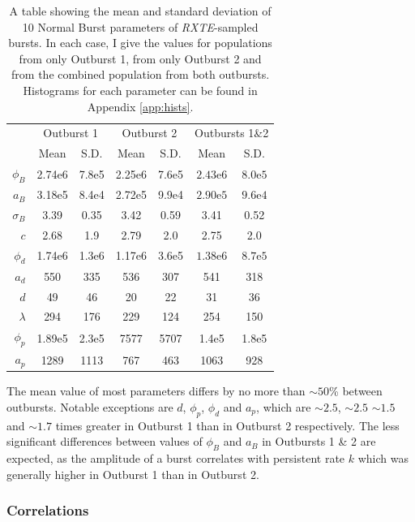 \begin{table}
\centering
\begin{tabular}{r c c c c c c}
\hline
\hline
 & \multicolumn{2}{c}{\scriptsize Outburst 1} & \multicolumn{2}{c}{\scriptsize Outburst 2} & \multicolumn{2}{c}{\scriptsize Outbursts 1\&2}  \\
 &Mean&S.D.&Mean&S.D.&Mean&S.D.\\
\hline
$\phi_B$&2.74e6&7.8e5&2.25e6&7.6e5&$2.43\mathrm{e}6$&$8.0\mathrm{e}5$\\
$a_B$&3.18e5&8.4e4&2.72e5&9.9e4&$2.90\mathrm{e}5$&$9.6\mathrm{e}4$\\
$\sigma_B$&3.39&0.35&3.42&0.59&3.41&0.52\\
$c$&2.68&1.9&2.79&2.0&2.75&2.0\\
$\phi_d$&1.74e6&1.3e6&1.17e6&3.6e5&$1.38\mathrm{e}6$&$8.7\mathrm{e}5$\\
$a_d$&550&335&536&307&541&318\\
$d$&49&46&20&22&31&36\\
$\lambda$&294&176&229&124&254&150\\
$\phi_p$&1.89e5&2.3e5&7577&5707&1.4e5&1.8e5\\
$a_p$&1289&1113&767&463&1063&928\\
\hline
\hline
\end{tabular}
\caption[A table showing the mean and standard deviation of 10 Normal Burst parameters of \textit{RXTE}-sampled bursts.]{A table showing the mean and standard deviation of 10 Normal Burst parameters of \indexrxte\textit{RXTE}-sampled bursts.  In each case, I give the values for populations from only Outburst 1, from only Outburst 2 and from the combined population from both outbursts.  Histograms for each parameter can be found in Appendix \ref{app:hists}.}
\label{tab:params_perob}
\end{table}

\par The mean value of most parameters differs by no more than $\sim50$\% between outbursts.  Notable exceptions are $d$, $\phi_p$, $\phi_d$ and $a_p$, which are $\sim2.5$, $\sim2.5$ $\sim1.5$ and $\sim1.7$ times greater in Outburst 1 than in Outburst 2 respectively.  The less significant differences between values of $\phi_B$ and $a_B$ in Outbursts 1 \& 2 are expected, as the amplitude of a burst correlates with persistent rate $k$ which was generally higher in Outburst 1 than in Outburst 2.

\subsubsection{Correlations}

